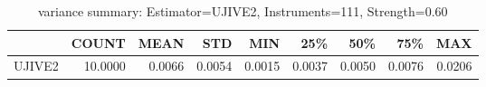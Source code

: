 \begin{table}[ht]
\centering
\caption{variance summary: Estimator=UJIVE2, Instruments=111, Strength=0.60}
\begin{tabular}{lrrrrrrrr}
\toprule
 & COUNT & MEAN & STD & MIN & 25\% & 50\% & 75\% & MAX \\
\midrule
UJIVE2 & 10.0000 & 0.0066 & 0.0054 & 0.0015 & 0.0037 & 0.0050 & 0.0076 & 0.0206 \\
\bottomrule
\end{tabular}
\end{table}
